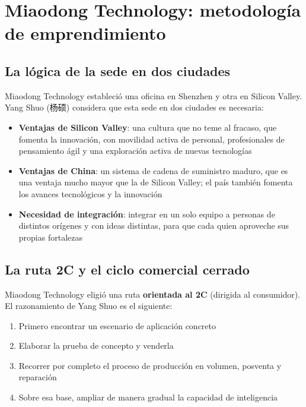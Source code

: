 \section{Miaodong Technology: metodología de emprendimiento}

\subsection{La lógica de la sede en dos ciudades}

Miaodong Technology estableció una oficina en Shenzhen y otra en Silicon Valley. Yang Shuo (杨硕) considera que esta sede en dos ciudades es necesaria:

\begin{itemize}
    \item \textbf{Ventajas de Silicon Valley}: una cultura que no teme al fracaso, que fomenta la innovación, con movilidad activa de personal, profesionales de pensamiento ágil y una exploración activa de nuevas tecnologías
    \item \textbf{Ventajas de China}: un sistema de cadena de suministro maduro, que es una ventaja mucho mayor que la de Silicon Valley; el país también fomenta los avances tecnológicos y la innovación
    \item \textbf{Necesidad de integración}: integrar en un solo equipo a personas de distintos orígenes y con ideas distintas, para que cada quien aproveche sus propias fortalezas
\end{itemize}

\subsection{La ruta 2C y el ciclo comercial cerrado}

Miaodong Technology eligió una ruta \textbf{orientada al 2C} (dirigida al consumidor). El razonamiento de Yang Shuo es el siguiente:

\begin{enumerate}
    \item Primero encontrar un escenario de aplicación concreto
    \item Elaborar la prueba de concepto y venderla
    \item Recorrer por completo el proceso de producción en volumen, posventa y reparación
    \item Sobre esa base, ampliar de manera gradual la capacidad de inteligencia
\end{enumerate}

